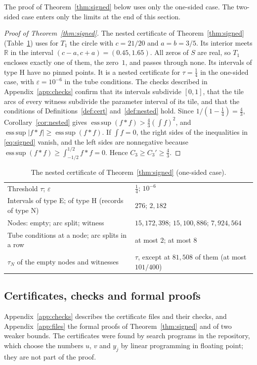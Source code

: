 \documentclass[11pt]{amsart}
\theoremstyle{definition}
\theoremstyle{remark}
\numberwithin{equation}{section}
\newcommand{\R}{\mathbb{R}}
\newcommand{\esssup}{\operatorname*{ess\,sup}}
\newcommand{\TauThrP}{\tfrac14}
\newcommand{\CthrPFrac}{\tfrac43}
\newcommand{\QEps}{10^{-6}}
\newcommand{\QTabE}{276}
\newcommand{\QTabH}{2{,}182}
\newcommand{\QTabNodes}{$15{,}172{,}398$; $15{,}100{,}886$; $7{,}924{,}564$}
\newcommand{\QTabChain}{8}
\newcommand{\QTabTubes}{2}
\newcommand{\QTabTauN}{81{,}508}
\newcommand{\QTabTauMax}{101/400}
\newcommand{\QCheckSentence}{The checks described in Appendix~\ref{app:checks} confirm that its intervals subdivide $[0,1]$, that the tile arcs of every witness subdivide the parameter interval of its tile, and that the conditions of Definitions~\ref{def:cert} and~\ref{def:nested} hold.}
\begin{document}
The proof of Theorem~\ref{thm:signed} below uses only the one-sided case. The two-sided case enters only the limits at the end of this section.

\begin{proof}[Proof of Theorem~\ref{thm:signed}]
The nested certificate of Theorem~\ref{thm:signed} (Table~\ref{tab:signed}) uses for $T_1$ the circle with $c=21/20$ and $a=b=3/5$. Its interior meets $\R$ in the interval $(c-a,c+a)=(0.45,1.65)$. All zeros of $S$ are real, so $T_1$ encloses exactly one of them, the zero~$1$, and passes through none. Its intervals of type H have no pinned points. It is a nested certificate for $\tau=\TauThrP$ in the one-sided case, with $\varepsilon=\QEps$ in the tube conditions. \QCheckSentence{} Since $1/(1-\TauThrP)=\CthrPFrac$, Corollary~\ref{cor:nested} gives $\esssup(f*f)>\CthrPFrac(\int f)^2$, and $\esssup|f*f|\ge\esssup(f*f)$. If $\int f=0$, the right sides of the inequalities in \eqref{eq:signed} vanish, and the left sides are nonnegative because $\esssup(f*f)\ge\int_{-1/2}^{1/2}f*f=0$. Hence $C_3\ge C_3'\ge\CthrPFrac$.
\end{proof}

\begin{table}[ht]
\centering
\caption{The nested certificate of Theorem~\ref{thm:signed} (one-sided case).}\label{tab:signed}
\small
\begin{tabular}{@{}lp{}@{}}
\toprule
Threshold $\tau$; $\varepsilon$ & $\TauThrP$; $\QEps$\\
Intervals of type E; of type H (records of type N) & $\QTabE$; $\QTabH$\\
Nodes: empty; arc split; witness & \QTabNodes\\
Tube conditions at a node; arc splits in a row & at most $\QTabTubes$; at most $\QTabChain$\\
$\tau_N$ of the empty nodes and witnesses & $\tau$, except at $\QTabTauN$ of them (at most $\QTabTauMax$)\\
\bottomrule
\end{tabular}
\end{table}


\subsection*{Certificates, checks and formal proofs}
Appendix~\ref{app:checks} describes the certificate files and their checks, and Appendix~\ref{app:files} the formal proofs of Theorem~\ref{thm:signed} and of two weaker bounds. The certificates were found by search programs in the repository, which choose the numbers $u$, $v$ and $y_j$ by linear programming in floating point; they are not part of the proof.
\end{document}
